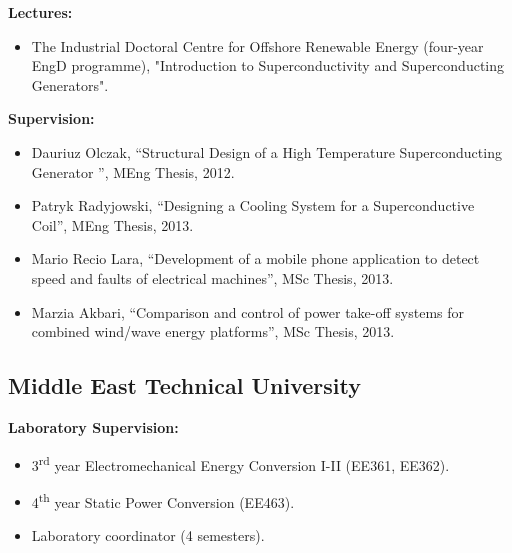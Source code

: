 \documentclass[a4paper,12pt]{article}
\begin{document}
\textbf{Lectures:}
\begin{itemize}
\item The Industrial Doctoral Centre for Offshore Renewable Energy (four-year EngD programme), "Introduction to Superconductivity and Superconducting Generators".
\end{itemize}


\textbf{Supervision:}
\begin{itemize}
\item Dauriuz Olczak, ``Structural Design of a High Temperature Superconducting Generator
'', MEng Thesis, 2012.
\item Patryk Radyjowski, ``Designing a Cooling System for a Superconductive Coil'', MEng Thesis, 2013.
\item Mario Recio Lara, ``Development of a mobile phone application to detect speed and faults of electrical machines'', MSc Thesis, 2013.
\item Marzia Akbari, ``Comparison and control of power take-off systems for combined wind/wave energy platforms'', MSc Thesis, 2013.
\end{itemize}


\subsection{Middle East Technical University}

\textbf{Laboratory Supervision:}
\begin{itemize}
\item 3\textsuperscript{rd} year Electromechanical Energy Conversion I-II (EE361, EE362).
\item 4\textsuperscript{th} year Static Power Conversion (EE463).
\item Laboratory coordinator (4 semesters). 
\end{itemize}
\end{document}
